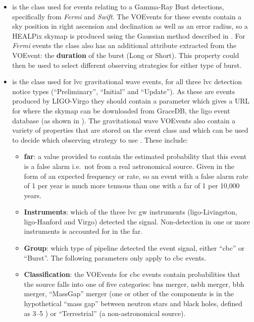 \begin{colsection}
\begin{colsection}
\begin{itemize}
    \item {} is the class used for events relating to a Gamma-Ray Bust detections, specifically from \textit{Fermi} and \textit{Swift}. The VOEvents for these events contain a sky position in right ascension and declination as well as an error radius, so a HEALPix skymap is produced using the Gaussian method described in . For \textit{Fermi} events the class also has an additional attribute extracted from the VOEvent: the \textbf{duration} of the burst (Long or Short). This property could then be used to select different observing strategies for either type of burst.

    \item {} is the class used for \gls{lvc} gravitational wave events, for all three \gls{lvc} detection notice types (``Preliminary'', ``Initial'' and ``Update''). As these are events produced by LIGO-Virgo they should contain a  parameter which gives a URL for where the skymap can be downloaded from GraceDB, the \gls{ligo} event database (as shown in ). The gravitational wave VOEvents also contain a variety of properties that are stored on the event class and which can be used to decide which observing strategy to use \citep{LVC_userguide}. These include:
    \begin{itemize}
        \item \textbf{\gls{far}}: a value provided to contain the estimated probability that this event is a false alarm i.e.\ not from a real astronomical source. Given in the form of an expected frequency or rate, so an event with a false alarm rate of 1 per year is much more tenuous than one with a \gls{far} of 1 per 10,000 years.
        \item \textbf{Instruments}: which of the three \gls{lvc} \gls{gw} instruments (\gls{ligo}-Livingston, \gls{ligo}-Hanford and Virgo) detected the signal. Non-detection in one or more instruments is accounted for in the \gls{far}.
        \item \textbf{Group}: which type of pipeline detected the event signal, either ``\gls{cbc}'' or ``Burst''. The following parameters only apply to \gls{cbc} events.
        \item \textbf{Classification}: the VOEvents for \gls{cbc} events contain probabilities that the source falls into one of five categories: \gls{bns} merger, \gls{nsbh} merger, \gls{bbh} merger, ``MassGap'' merger (one or other of the components is in the hypothetical ``mass gap'' between neutron stars and black holes, defined as 3--\SI{5}{\solarmass} \citep{GW_MassGap}) or ``Terrestrial'' (a non-astronomical source).

\end{itemize}
\end{itemize}
\end{colsection}
\end{colsection}
